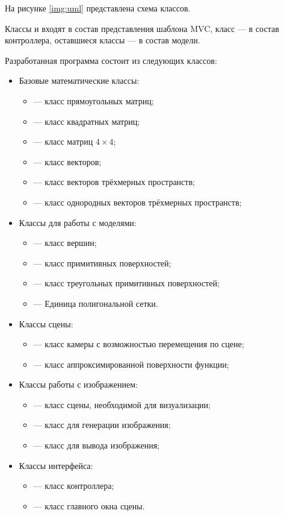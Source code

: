На рисунке \ref{img:uml} представлена схема классов.


Классы  и  входят в состав представления шаблона MVC, класс  — в состав контроллера, оставшиеся классы — в состав модели. 

Разработанная программа состоит из следующих классов:
\begin{itemize}
	\item Базовые математические классы: \begin{itemize}
		\item {} — класс прямоугольных матриц;
		\item {} — класс квадратных матриц;
		\item {} — класс матриц $4\times4$;
		\item {} — класс векторов;
		\item {} — класс векторов трёхмерных пространств;
		\item {} — класс однородных векторов трёхмерных пространств;
	\end{itemize}

	\item Классы для работы с моделями: \begin{itemize}
		\item {} — класс вершин;
		\item {} — класс примитивных поверхностей;
		\item {} — класс треугольных примитивных поверхностей;
		\item {} — Единица полигональной сетки.
	\end{itemize}

	\item Классы сцены: \begin{itemize}
		\item {} — класс камеры с возможностью перемещения по сцене;
		\item {} — класс аппроксимированной поверхности функции;
	\end{itemize}

	\item Классы работы с изображением: \begin{itemize}
		\item {} — класс сцены, необходимой для визуализации;
		\item {} — класс для генерации изображения;
		\item {} — класс для вывода изображения;
	\end{itemize}

	\item Классы интерфейса: \begin{itemize}
		\item {} — класс контроллера;
		\item {} — класс главного окна сцены.
	\end{itemize}
	
\end{itemize}
